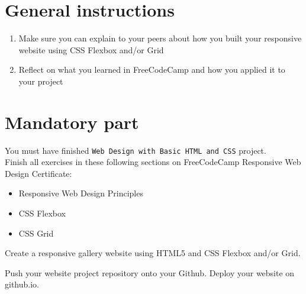 \documentclass{42-en}
\begin{document}
\chapter{General instructions}

\begin{enumerate}
    \item Make sure you can explain to your peers about how you built your responsive website using CSS Flexbox and/or Grid
    \item Reflect on what you learned in FreeCodeCamp and how you applied it to your project
\end{enumerate}
   
    



\chapter{Mandatory part}

You must have finished \texttt{Web Design with Basic HTML and CSS} project.\\

Finish all exercises in these following sections on FreeCodeCamp Responsive Web Design Certificate:
\begin{itemize}
    \item Responsive Web Design Principles
    \item CSS Flexbox
    \item CSS Grid
\end{itemize}
\vspace{0.2in}

Create a responsive gallery website using HTML5 and CSS Flexbox and/or Grid.\par
\vspace{0.2in}
Push your website project repository onto your Github. Deploy your website on github.io.
    
\end{document}
